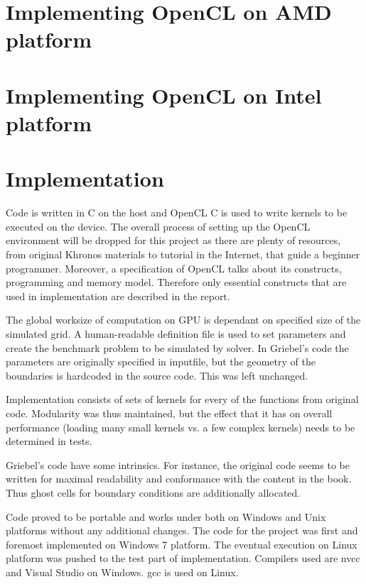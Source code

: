 \section{Implementing OpenCL on AMD platform}

\section{Implementing OpenCL on Intel platform}

\section{Implementation}
Code is written in C on the host and OpenCL C is used to write kernels to be executed on the device. The overall process of setting up the OpenCL environment will be dropped for this project as there are plenty of resources, from original Khronos materials to tutorial in the Internet, that guide a beginner programmer. Moreover, a specification of OpenCL talks about its constructs, programming and memory model. Therefore only essential constructs that are used in implementation are described in the report. 

The global worksize of computation on GPU is dependant on specified size of the simulated grid. A human-readable definition file is used to set parameters and create the benchmark problem to be simulated by solver. In Griebel's code the parameters are originally specified in inputfile, but the geometry of the boundaries is hardcoded in the source code. This was left unchanged.

Implementation consists of sets of kernels for every of the functions from original code. Modularity was thus maintained, but the effect that it has on overall performance (loading many small kernels vs. a few complex kernels) needs to be determined in tests.

Griebel's code have some intrinsics. For instance, the original code seems to be written for maximal readability and conformance with the content in the book. Thus ghost cells for boundary conditions are additionally allocated.

Code proved to be portable and works under both on Windows and Unix platforms without any additional changes. The code for the project was first and foremost implemented on Windows 7 platform. The eventual execution on Linux platform was pushed to the test part of implementation. Compilers used are nvcc and Visual Studio on Windows. gcc is used on Linux.

